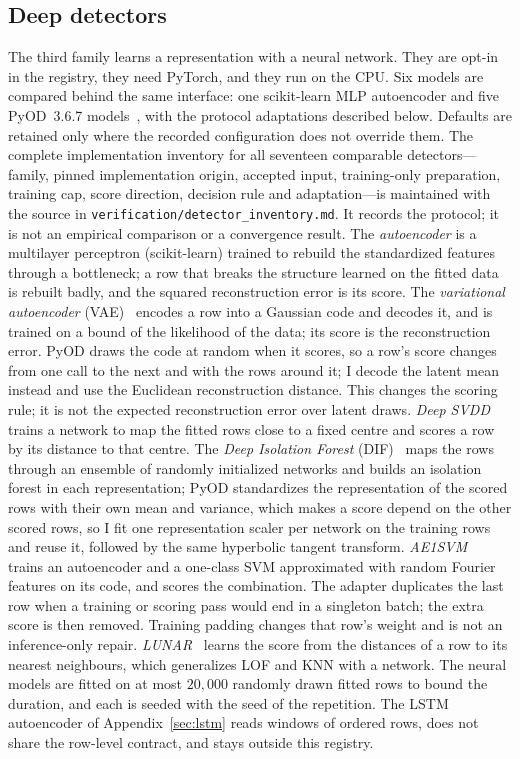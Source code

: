 \documentclass[conference]{IEEEtran}
\begin{document}
\subsection{Deep detectors}
The third family learns a representation with a neural network. They are
opt-in in the registry, they need PyTorch, and they run on the CPU. Six
models are compared behind the same interface: one scikit-learn MLP
autoencoder and five PyOD~3.6.7 models~\cite{chen2025pyod2}, with the
protocol adaptations described below. Defaults are retained only where
the recorded configuration does not override them.
The complete implementation inventory for all seventeen comparable
detectors---family, pinned implementation origin, accepted input,
training-only preparation, training cap, score direction, decision rule
and adaptation---is maintained with the source in
\texttt{verification/detector\_inventory.md}. It records the protocol;
it is not an empirical comparison or a convergence result.
The \emph{autoencoder} is a multilayer perceptron (scikit-learn) trained to
rebuild the standardized features through a bottleneck; a row that breaks the
structure learned on the fitted data is rebuilt badly, and the squared
reconstruction error is its score. The \emph{variational autoencoder}
(VAE)~\cite{kingma2014auto} encodes a row into a Gaussian code and decodes
it, and is trained on a bound of the likelihood of the data; its score is the
reconstruction error. PyOD draws the code at random when it scores, so a
row's score changes from one call to the next and with the rows around it;
I decode the latent mean instead and use the Euclidean reconstruction
distance. This changes the scoring rule; it is not the expected
reconstruction error over latent draws. \emph{Deep SVDD}~\cite{ruff2018deep}
trains a network to map the fitted rows close to a fixed centre and scores a
row by its distance to that centre. The \emph{Deep Isolation
Forest} (DIF)~\cite{xu2023deep} maps the rows through an ensemble of randomly
initialized networks and builds an isolation forest in each representation;
PyOD standardizes the representation of the scored rows with their own mean
and variance, which makes a score depend on the other scored rows, so I
fit one representation scaler per network on the training rows and reuse
it, followed by the same hyperbolic tangent transform. \emph{AE1SVM}~\cite{nguyen2019scalable}
trains an autoencoder and a one-class SVM approximated with random Fourier
features on its code, and scores the combination. The adapter duplicates
the last row when a training or scoring pass would end in a singleton
batch; the extra score is then removed. Training padding changes that
row's weight and is not an inference-only repair. \emph{LUNAR}~\cite{goodge2022lunar}
learns the score from the distances of a row to its nearest neighbours, which
generalizes LOF and KNN with a network. The neural models are fitted on at
most $20{,}000$ randomly drawn fitted rows to bound the duration, and each is
seeded with the seed of the repetition. The LSTM autoencoder of
Appendix~\ref{sec:lstm} reads windows of ordered rows, does not share the
row-level contract, and stays outside this registry.
\end{document}
